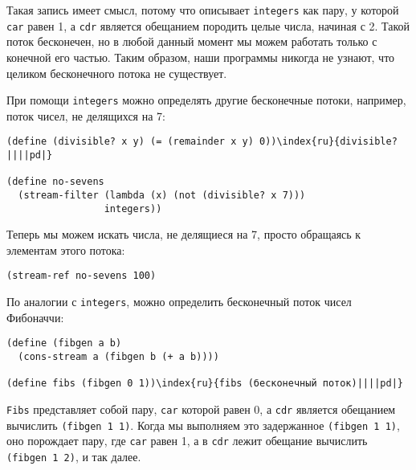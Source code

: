 Такая запись имеет смысл, потому что описывает
{\tt integers} как пару, у которой {\tt car} равен 1, а
{\tt cdr} является обещанием породить целые числа, начиная с 2.
Такой поток бесконечен, но в любой данный момент мы можем работать
только с конечной его частью.  Таким образом, наши программы никогда
не узнают, что целиком бесконечного потока не существует.

При помощи {\tt integers} можно определять другие
бесконечные потоки, например, поток чисел, не делящихся на 7:

\begin{Verbatim}[fontsize=\small]
(define (divisible? x y) (= (remainder x y) 0))\index{ru}{divisible?||||pd|}

(define no-sevens
  (stream-filter (lambda (x) (not (divisible? x 7)))
                 integers))
\end{Verbatim}

Теперь мы можем искать числа, не делящиеся на 7, просто обращаясь к
элементам этого потока:

\begin{Verbatim}[fontsize=\small]
(stream-ref no-sevens 100)
\end{Verbatim}


По аналогии с {\tt integers}, можно определить
бесконечный поток чисел Фибоначчи:

\begin{Verbatim}[fontsize=\small]
(define (fibgen a b)
  (cons-stream a (fibgen b (+ a b))))

(define fibs (fibgen 0 1))\index{ru}{fibs (бесконечный поток)||||pd|}
\end{Verbatim}

{\tt Fibs} представляет собой пару, {\tt car} которой
равен 0, а {\tt cdr} является обещанием вычислить {\tt (fibgen
1 1)}.  Когда мы выполняем это задержанное {\tt (fibgen 1
1)}, оно порождает пару, где {\tt car} равен 1, а в
{\tt cdr} лежит обещание вычислить {\tt (fibgen 1 2)}, и
так далее.


